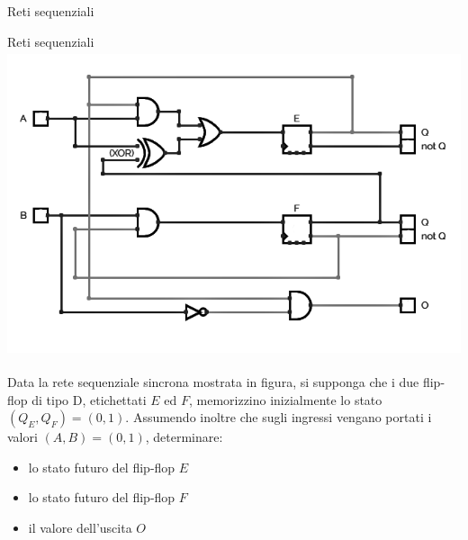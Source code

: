 \documentclass[11pt]{article}
\begin{document}
\begin{quiz}{Reti sequenziali}
\begin{cloze}[points=1,shuffle=false]{Reti sequenziali}
    \includegraphics[height=9cm]{figures/seq_3.png}
    
    Data la rete sequenziale sincrona mostrata in figura, si supponga che i due flip-flop di tipo D,
    etichettati $E$ ed $F$, memorizzino inizialmente lo stato $(Q_E,Q_F) = (0,1)$.
    Assumendo inoltre che sugli ingressi vengano portati i valori $(A,B)=(0,1)$,
    determinare:
    
    \begin{itemize}
    \item lo stato futuro del flip-flop $E$ 
    \item lo stato futuro del flip-flop $F$ 
    \item il valore dell'uscita $O$ 
    \end{itemize}
\end{cloze}

\end{quiz}
\end{document}
